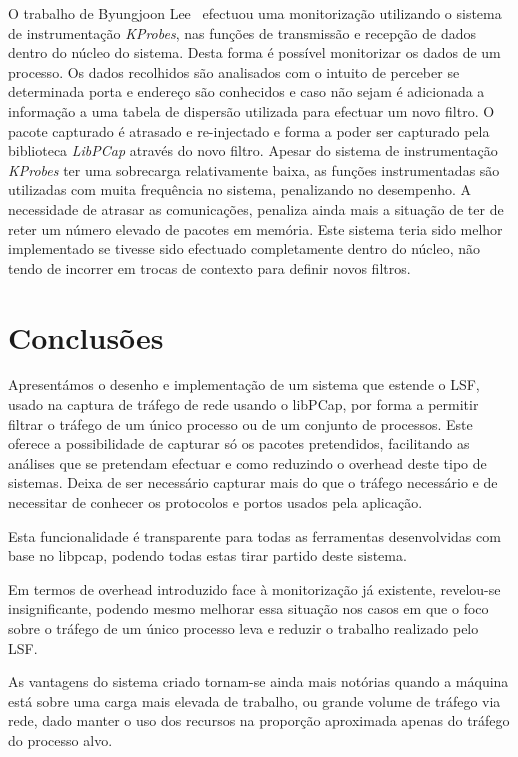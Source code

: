 \documentclass[a4paper]{llncs}
\begin{document}
O trabalho de Byungjoon Lee~\cite{1688981} efectuou uma monitorização utilizando o sistema de instrumentação \textit{KProbes}, nas funções de transmissão e recepção de dados dentro do núcleo do sistema. Desta forma é possível monitorizar os dados de um processo. Os dados recolhidos são analisados com o intuito de perceber se determinada porta e endereço são conhecidos e caso não sejam é adicionada a informação a uma tabela de dispersão
utilizada para efectuar um novo filtro. O pacote capturado  é atrasado e re-injectado e forma a poder ser capturado pela biblioteca \textit{LibPCap} através do novo filtro.
Apesar do sistema de instrumentação \textit{KProbes} ter uma sobrecarga relativamente baixa, as funções instrumentadas são utilizadas com muita frequência no sistema, penalizando no desempenho. A necessidade de atrasar as comunicações, penaliza ainda mais a situação de ter de reter um número elevado de pacotes em memória. Este sistema teria sido melhor implementado se tivesse sido efectuado completamente dentro do núcleo, não tendo de incorrer em trocas de contexto para definir novos filtros.



\section{Conclusões}
\label{sec:conclusions}

Apresentámos o desenho e implementação de um sistema que estende o LSF, usado na captura de tráfego de rede usando o libPCap, por forma a permitir filtrar o tráfego de um único processo ou de um conjunto de processos. Este oferece a possibilidade de capturar só os pacotes pretendidos, facilitando as análises que se pretendam efectuar e como reduzindo o overhead deste tipo de sistemas. Deixa de ser necessário capturar mais do que o tráfego necessário e de necessitar de conhecer os protocolos e portos usados pela aplicação.

Esta funcionalidade é transparente para todas as ferramentas desenvolvidas com base no libpcap, podendo todas estas tirar partido deste sistema.

Em termos de overhead introduzido face à monitorização já existente, revelou-se insignificante, podendo mesmo melhorar essa situação nos casos em que o foco sobre o tráfego de um único processo leva e reduzir o trabalho realizado pelo LSF.

As vantagens do sistema criado tornam-se ainda mais notórias quando a máquina está sobre uma carga mais elevada de trabalho, ou grande volume de tráfego via rede, dado manter o uso dos recursos na proporção aproximada apenas do tráfego do processo alvo. 
\end{document}
